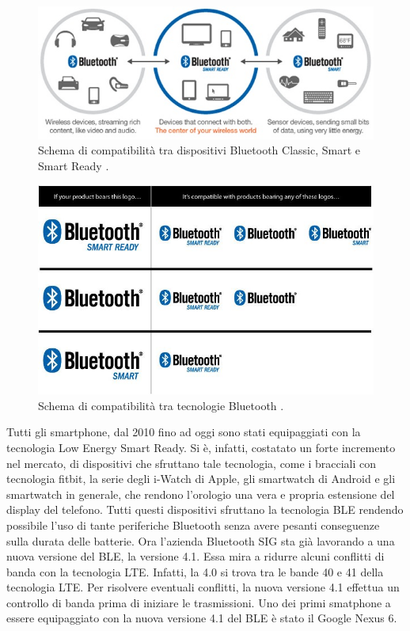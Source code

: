 \begin{figure}[t]
	\centering
	\includegraphics[width=0.9\linewidth, keepaspectratio]{Images/bt/bt_01}
	\caption[Schema di compatibilità Bluetooth.]{Schema di compatibilità tra dispositivi Bluetooth Classic, Smart e Smart Ready \cite{BT-Brand}.}
	\label{fig:bt_01}
\end{figure}

\begin{figure}[t]
	\centering
	\includegraphics[width=0.9\linewidth, keepaspectratio]{Images/bt/bt_02}
	\caption[Compatibilità tecnologie Bluetooth]{Schema di compatibilità tra tecnologie Bluetooth \cite{BT-2012-tabellacomparativa}.}
	\label{fig:bt_02}
\end{figure}

Tutti gli smartphone, dal 2010 fino ad oggi sono stati equipaggiati con la tecnologia Low Energy Smart Ready. Si è, infatti, costatato un forte incremento nel mercato, di dispositivi che sfruttano tale tecnologia, come i bracciali con tecnologia fitbit, la serie degli i-Watch di Apple, gli smartwatch di Android e gli smartwatch in generale, che rendono l'orologio una vera e propria estensione del display del telefono. Tutti questi dispositivi sfruttano la tecnologia \acs{BLE} rendendo possibile l'uso di tante periferiche Bluetooth senza avere pesanti conseguenze sulla durata delle batterie. Ora l'azienda Bluetooth SIG sta già lavorando a una nuova versione del \acs{BLE}, la versione 4.1. Essa mira a ridurre alcuni conflitti di banda con la tecnologia \acf{LTE}. Infatti, la 4.0 si trova tra le bande 40 e 41 della tecnologia \acs{LTE}. Per risolvere eventuali conflitti, la nuova versione 4.1 effettua un controllo di banda prima di iniziare le trasmissioni. Uno dei primi smatphone a essere equipaggiato con la nuova versione 4.1 del \acs{BLE} è stato il Google Nexus 6.
\bigskip

